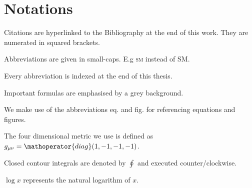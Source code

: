 \documentclass[../../index.tex]{subfiles}
\begin{document}
\chapter*{Notations}

Citations are hyperlinked to the Bibliography at the end of this work. They are
numerated in squared brackets. \vspace{0.3cm}

Abbreviations are given in small-caps. E.g \textsc{sm} instead of SM.
\vspace{0.3cm}

Every abbreviation is indexed at the end of this thesis. \vspace{0.3cm}

Important formulas are emphasised by a grey background. \vspace{0.3cm}

We make use of the abbreviations eq. and fig. for referencing equations and
figures. \vspace{0.3cm}

The four dimensional metric we use is defined as \(g_{\mu\nu} =
\mathoperator{diag}(1, -1, -1, -1)\). \vspace{0.3cm}

Closed contour integrals are denoted by \(\oint\) and executed
counter\-/clockwise. \vspace{0.3cm}

\(\log x\) represents the natural logarithm of \(x\).
\end{document}
